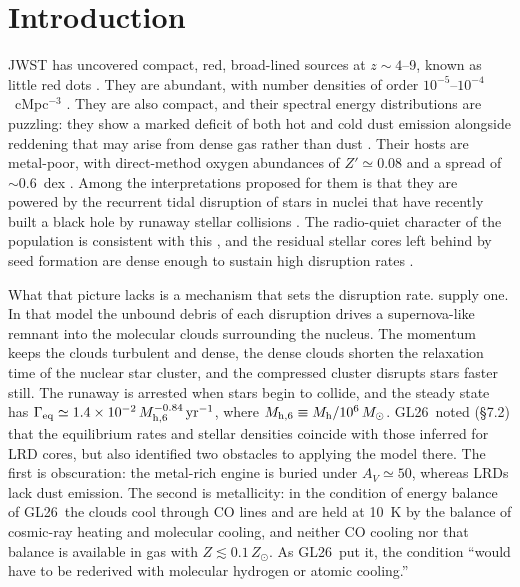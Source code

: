 \documentclass[twocolumn,pdftex]{aastex701}
\newcommand{\msun}{M_{\odot}}
\newcommand{\Mh}{M_{\rm h}}
\newcommand{\mhsix}{M_{\rm h,6}}
\newcommand{\Geq}{\Gamma_{\rm eq}}
\newcommand{\GL}{GL26}
\begin{document}

\section{Introduction}\label{sec:intro}

JWST has uncovered compact, red, broad-lined sources at $z\sim4$--9, known as little red dots \citep[LRDs;][]{Matthee:2024a,Greene:2024a,Harikane:2023a,Kocevski:2025a}. They are abundant, with number densities of order $10^{-5}$--$10^{-4}$~cMpc$^{-3}$ \citep{Matthee:2024a,Kokorev:2024a,Akins:2025a}. They are also compact, and their spectral energy distributions are puzzling: they show a marked deficit of both hot and cold dust emission \citep{Setton:2025a,Chen:2025a,Casey:2025a} alongside reddening that may arise from dense gas rather than dust \citep{Inayoshi:2025a,Naidu:2025a,deGraaff:2026a}. Their hosts are metal-poor, with direct-method oxygen abundances of $Z'\simeq0.08$ and a spread of $\sim0.6$~dex \citep{Nikopoulos:2026a}. Among the interpretations proposed for them is that they are powered by the recurrent tidal disruption of stars in nuclei that have recently built a black hole by runaway stellar collisions \citep{Bellovary:2025a,Pacucci:2025a,Kritos:2026a}. The radio-quiet character of the population is consistent with this \citep{Perger:2025a}, and the residual stellar cores left behind by seed formation are dense enough to sustain high disruption rates \citep{Pacucci:2025a}.

What that picture lacks is a mechanism that sets the disruption rate. \citet[hereafter \GL]{Guillochon:2026a} supply one. In that model the unbound debris of each disruption drives a supernova-like remnant into the molecular clouds surrounding the nucleus. The momentum keeps the clouds turbulent and dense, the dense clouds shorten the relaxation time of the nuclear star cluster, and the compressed cluster disrupts stars faster still. The runaway is arrested when stars begin to collide, and the steady state has $\Geq \simeq 1.4\times10^{-2}\,\mhsix^{-0.84}\,{\rm yr^{-1}}$, where $\mhsix \equiv \Mh/10^{6}\,\msun$. \GL\ noted (\S7.2) that the equilibrium rates and stellar densities coincide with those inferred for LRD cores, but also identified two obstacles to applying the model there. The first is obscuration: the metal-rich engine is buried under $A_V\simeq50$, whereas LRDs lack dust emission. The second is metallicity: in the condition of energy balance of \GL\ the clouds cool through CO lines and are held at 10~K by the balance of cosmic-ray heating and molecular cooling, and neither CO cooling nor that balance is available in gas with $Z\lesssim 0.1\,Z_\odot$. As \GL\ put it, the condition ``would have to be rederived with molecular hydrogen or atomic cooling.''
\end{document}
